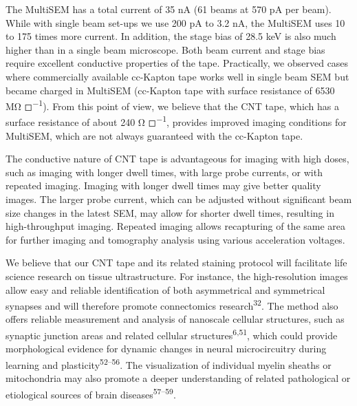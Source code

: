 \documentclass{article}
\begin{document}
The MultiSEM has a total current of 35 nA (61 beams at 570 pA per beam). While with single beam set-ups we use 200 pA to 3.2 nA, the MultiSEM uses 10 to 175 times more current. In addition, the stage bias of 28.5 keV is also much higher than in a single beam microscope. Both beam current and stage bias require excellent conductive properties of the tape. Practically, we observed cases where commercially available cc-Kapton tape works well in single beam SEM but became charged in MultiSEM (cc-Kapton tape with surface resistance of 6530 MΩ ◻\textsuperscript{−1}). From this point of view, we believe that the CNT tape, which has a surface resistance of about 240 Ω ◻\textsuperscript{−1}, provides improved 
imaging conditions for MultiSEM, which are not always guaranteed with the cc-Kapton tape.

The conductive nature of CNT tape is advantageous for imaging with high doses, such as imaging with longer dwell times, with large probe currents, or with repeated imaging. Imaging with longer dwell times may give better quality images. The larger probe current, which can be adjusted without significant beam size changes in the latest SEM, may allow for shorter dwell times, resulting in high-throughput imaging. Repeated imaging allows recapturing of the same area for further imaging and tomography analysis using various acceleration voltages.

We believe that our CNT tape and its related staining protocol will facilitate life science research on tissue ultrastructure. For instance, the high-resolution images allow easy and reliable identification of both asymmetrical and symmetrical synapses and will therefore promote connectomics research\textsuperscript{32}. The method also offers reliable measurement and analysis of nanoscale cellular structures, such as synaptic junction areas and related cellular structures\textsuperscript{6,51}, which could provide morphological evidence for dynamic changes in neural microcircuitry during learning and plasticity\textsuperscript{52–56}. The visualization of individual myelin sheaths or mitochondria may also promote a deeper understanding of related pathological or etiological sources of brain diseases\textsuperscript{57–59}.
\end{document}

